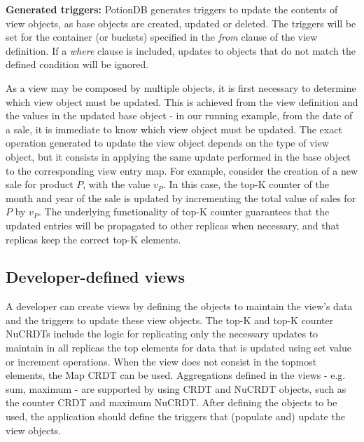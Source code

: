 \documentclass[sigplan,twocolumn,review,anonymous]{acmart}
\begin{document}
\noindent
\textbf{Generated triggers:}
PotionDB generates triggers to update 
the contents of view objects,
as base objects are created, updated or deleted.
The triggers will be set for the container (or buckets) specified in the \emph{from} clause of the view definition.
If a \emph{where} clause is included, updates to objects that do not match the 
defined condition will be ignored.

As a view may be composed by multiple objects, it is first necessary to 
determine which view object must be updated. This is achieved from the view definition 
and the values in the updated base object - in our running example, 
from the date of a sale, it is immediate to know which view object
must be updated.
The exact operation generated to update the view object depends on the type of view object, 
but it consists in applying the same update performed in the base object to the 
corresponding view entry map.
For example, consider the creation of a new sale for product $P$, with the value $v_P$. 
In this case, the top-K counter of the month and year of the sale is updated by 
incrementing the total value of sales for $P$ by $v_P$. 
The underlying functionality of top-K counter guarantees that the updated entries
will be propagated to other replicas when necessary, and that replicas keep the correct top-K
elements.

\subsection{Developer-defined views}
\label{subsec:programmer_view}

A developer can create views by defining the objects to maintain the view's data and the
triggers to update these view objects.
The top-K and top-K counter NuCRDTs include the logic for replicating only the necessary 
updates to maintain in all replicas the top elements for data that is updated using set value 
or increment operations.
When the view does not consist in the topmost elements, the Map CRDT can be used.  
Aggregations defined in the views - e.g. sum, maximum - are supported by using CRDT and NuCRDT 
objects, such as the counter CRDT and maximum NuCRDT.
After defining the objects to be used, the application should define the triggers that (populate and) 
update the view objects. 
\end{document}

